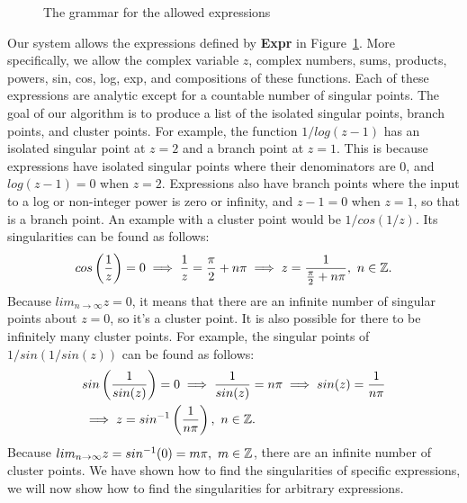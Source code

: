 \begin{figure}[H]
	
	\caption{The grammar for the allowed expressions}
	\label{fig:grammar}
\end{figure}

Our system allows the expressions defined by \textbf{Expr} in Figure~\ref{fig:grammar}. More specifically, we allow the complex variable $z$, complex numbers, sums, products, powers, sin, cos, log, exp, and compositions of these functions. Each of these expressions are analytic except for a countable number of singular points. The goal of our algorithm is to produce a list of the isolated singular points, branch points, and cluster points. For example, the function $1/log(z-1)$ has an isolated singular point at $z=2$ and a branch point at $z=1$. This is because expressions have isolated singular points where their denominators are $0$, and $log(z-1)=0$ when $z=2$. Expressions also have branch points where the input to a log or non-integer power is zero or infinity, and $z-1=0$ when $z=1$, so that is a branch point. An example with a cluster point would be $1/cos(1/z)$. Its singularities can be found as follows:
\[
	cos\left(\frac{1}{z}\right) = 0
	\implies \frac{1}{z} = \frac{\pi}{2}+n\pi
	\implies z = \frac{1}{\frac{\pi}{2}+n\pi}, \ n\in\mathbb{Z}.
\]
Because $lim_{n\to\infty}z=0$, it means that there are an infinite number of singular points about $z=0$, so it's a cluster point. It is also possible for there to be infinitely many cluster points. For example, the singular points of $1/sin(1/sin(z))$ can be found as follows:
\begin{align*}
	& sin\left(\frac{1}{sin(z)}\right) = 0 \implies \frac{1}{sin(z)} = n\pi
	\implies sin(z) = \frac{1}{n\pi} \\
	& \implies z = sin^{-1}\left(\frac{1}{n\pi}\right), \ n\in\mathbb{Z}.
\end{align*}
Because $lim_{n\to\infty}z=sin^{-1}(0)=m\pi, \ m \in\mathbb{Z}$, there are an infinite number of cluster points. We have shown how to find the singularities of specific expressions, we will now show how to find the singularities for arbitrary expressions.
